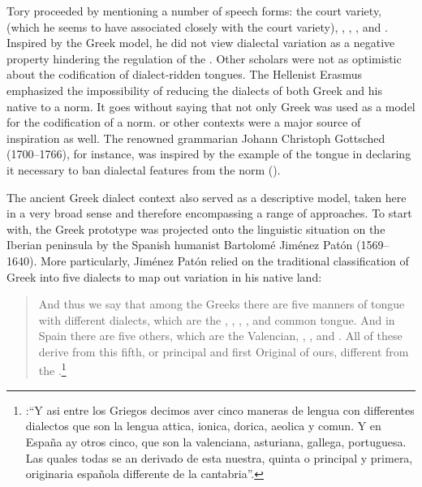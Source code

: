 Tory proceeded by mentioning a number of  speech forms: the court variety,  (which he seems to have associated closely with the court variety), , , , and . Inspired by the Greek model, he did not view dialectal variation as a negative property hindering the regulation of the . Other scholars were not as optimistic about the codification of dialect-ridden tongues. The Hellenist Erasmus \citet[239]{Schmidt1615} emphasized the impossibility of reducing the dialects of both Greek and his native  to a norm. It goes without saying that not only Greek was used as a model for the codification of a norm.  or other  contexts were a major source of inspiration as well. The renowned grammarian Johann Christoph Gottsched (1700–1766), for instance, was inspired by the example of the  tongue in declaring it necessary to ban dialectal features from the  norm (\citeyear[334]{Gottsched1748}).

The ancient Greek dialect context also served as a descriptive model, taken here in a very broad sense and therefore encompassing a range of approaches. To start with, the Greek prototype was projected onto the linguistic situation on the Iberian peninsula by the Spanish humanist Bartolomé Jiménez Patón (1569–1640). More particularly, Jiménez Patón relied on the traditional classification of Greek into five dialects to map out variation in his native land:

\begin{quote}
And thus we say that among the Greeks there are five manners of tongue with different dialects, which are the , , , , and common tongue. And in Spain there are five others, which are the Valencian, , , and . All of these derive from this fifth, or principal and first Original  of ours, different from the .\footnote{\citet[10\textsc{\textsuperscript{r}}\textsc{–10}\textsc{\textsuperscript{v}}]{Jimenez1604}:“Y asi entre los Griegos decimos aver cinco maneras de lengua con differentes dialectos que son la lengua attica, ionica, dorica, aeolica y comun. Y en España ay otros cinco, que son la valenciana, asturiana, gallega, portuguesa. Las quales todas se an derivado de esta nuestra, quinta o principal y primera, originaria española differente de la cantabria”.}
\end{quote}

